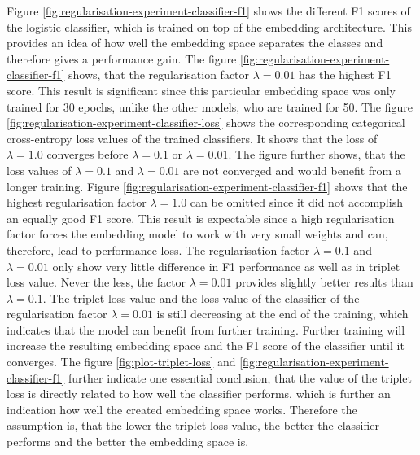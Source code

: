 \newline
\newline
\noindent
Figure \ref{fig:regularisation-experiment-classifier-f1} shows the different F1 scores of the logistic classifier, which is trained on top of the embedding architecture. This provides an idea of how well the embedding space separates the classes and therefore gives a performance gain. The figure \ref{fig:regularisation-experiment-classifier-f1} shows, that the regularisation factor $\lambda = 0.01$ has the highest F1 score. This result is significant since this particular embedding space was only trained for 30 epochs, unlike the other models, who are trained for 50. 
\newline
\newline
The figure \ref{fig:regularisation-experiment-classifier-loss} shows the corresponding categorical cross-entropy loss values of the trained classifiers. It shows that the loss of $\lambda = 1.0$ converges before $\lambda = 0.1$ or $\lambda = 0.01$. The figure further shows, that the loss values of $\lambda = 0.1$ and $\lambda = 0.01$ are not converged and would benefit from a longer training.
\newline
\newline
Figure \ref{fig:regularisation-experiment-classifier-f1} shows that the highest regularisation factor $\lambda = 1.0$ can be omitted since it did not accomplish an equally good F1 score. This result is expectable since a high regularisation factor forces the embedding model to work with very small weights and can, therefore, lead to performance loss. 
\newline
\newline
The regularisation factor $\lambda = 0.1$ and $\lambda = 0.01$ only show very little difference in F1 performance as well as in triplet loss value. Never the less, the factor $\lambda = 0.01$ provides slightly better results than $\lambda = 0.1$. The triplet loss value and the loss value of the classifier of the regularisation factor $\lambda = 0.01$ is still decreasing at the end of the training, which indicates that the model can benefit from further training. Further training will increase the resulting embedding space and the F1 score of the classifier until it converges.
\newline
\newline
The figure \ref{fig:plot-triplet-loss} and \ref{fig:regularisation-experiment-classifier-f1} further indicate one essential conclusion, that the value of the triplet loss is directly related to how well the classifier performs, which is further an indication how well the created embedding space works. Therefore the assumption is, that the lower the triplet loss value, the better the classifier performs and the better the embedding space is. 
